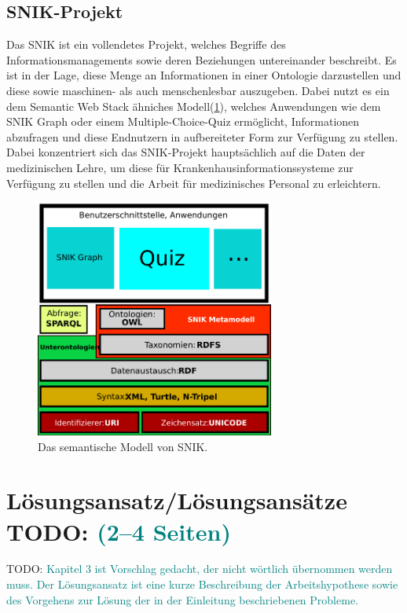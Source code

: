 \documentclass[headsepline,titlepage,ngerman,twoside,12pt]{report}
\newcommand\todo[1]{TODO: \textcolor{teal}{#1}}
\begin{document}
\section{\acs{SNIK}-Projekt}
Das \ac{SNIK} ist ein vollendetes Projekt, welches Begriffe des Informationsmanagements sowie deren Beziehungen untereinander beschreibt.
Es ist in der Lage, diese Menge an Informationen in einer Ontologie darzustellen und diese sowie maschinen- als auch menschenlesbar auszugeben.
 Dabei nutzt es ein dem Semantic Web Stack ähniches Modell(\cref{img:semanticwebstack2}), welches Anwendungen wie dem \ac{SNIK} Graph oder einem Multiple-Choice-Quiz ermöglicht, Informationen abzufragen und diese Endnutzern in aufbereiteter Form zur Verfügung zu stellen.
Dabei konzentriert sich das SNIK-Projekt hauptsächlich auf die Daten der medizinischen Lehre, um diese für Krankenhausinformationssysteme zur Verfügung zu stellen und die Arbeit für medizinisches Personal zu erleichtern.
\begin{figure}
\centering
\includegraphics[width=0.7\textwidth]{images/swebstackde_snik.pdf}
\caption{Das semantische Modell von SNIK.}
\label{img:semanticwebstack2}
\end{figure}

\chapter{Lösungsansatz/Lösungsansätze \todo{(2--4 Seiten)}}
\todo{Kapitel 3 ist Vorschlag gedacht, der nicht wörtlich übernommen werden muss.
Der Lösungsansatz ist eine kurze Beschreibung der Arbeitshypothese sowie des Vorgehens zur Lösung der in der Einleitung beschriebenen Probleme.}
\end{document}

